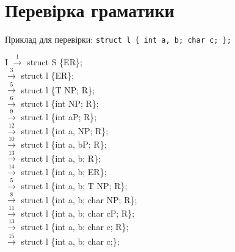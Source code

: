 \newpage
\section{Перевірка граматики}
Приклад для перевірки: \verb|struct l { int a, b; char c; };|

\noindent
I $\xrightarrow{1}$ struct S \{ER\}; \\
$\xrightarrow{3}$ struct l \{ER\}; \\
$\xrightarrow{5}$ struct l \{T NP; R\}; \\
$\xrightarrow{6}$ struct l \{int NP; R\}; \\
$\xrightarrow{9}$ struct l \{int aP; R\}; \\
$\xrightarrow{12}$ struct l \{int a, NP; R\}; \\
$\xrightarrow{10}$ struct l \{int a, bP; R\}; \\
$\xrightarrow{13}$ struct l \{int a, b; R\}; \\
$\xrightarrow{14}$ struct l \{int a, b; ER\}; \\
$\xrightarrow{5}$ struct l \{int a, b; T NP; R\}; \\
$\xrightarrow{8}$ struct l \{int a, b; char NP; R\}; \\
$\xrightarrow{11}$ struct l \{int a, b; char cP; R\}; \\
$\xrightarrow{13}$ struct l \{int a, b; char c; R\}; \\
$\xrightarrow{15}$ struct l \{int a, b; char c;\}; \\
